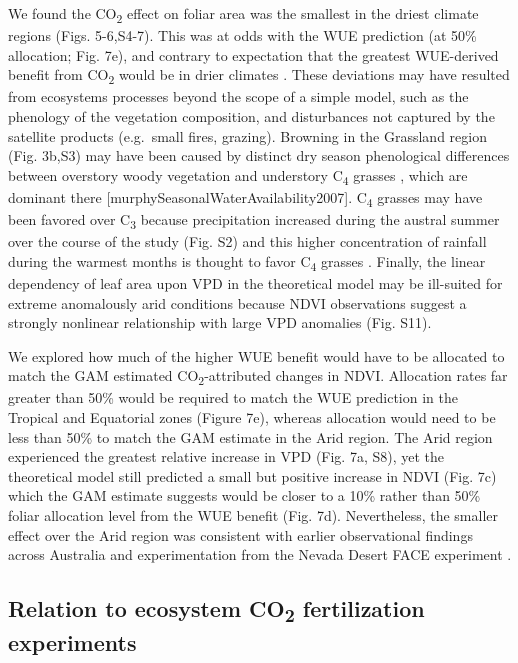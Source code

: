 \documentclass[gc, manuscript]{copernicus}
\begin{document}
We found the CO\textsubscript{2} effect on foliar area was the smallest
in the driest climate regions (Figs. 5-6,S4-7). This was at odds with
the WUE prediction (at 50\% allocation; Fig. 7e), and contrary to
expectation that the greatest WUE-derived benefit from
CO\textsubscript{2} would be in drier climates
\citep{donohue_etal17, mcmurtrieWhyPlantgrowthResponse2008}. These
deviations may have resulted from ecosystems processes beyond the scope
of a simple model, such as the phenology of the vegetation composition,
and disturbances not captured by the satellite products (e.g.~small
fires, grazing). Browning in the Grassland region (Fig. 3b,S3) may have
been caused by distinct dry season phenological differences between
overstory woody vegetation and understory C\textsubscript{4} grasses
\citep{mooreReviewsSynthesesAustralian2016}, which are dominant there
{[}murphySeasonalWaterAvailability2007{]}. C\textsubscript{4} grasses
may have been favored over C\textsubscript{3} because precipitation
increased during the austral summer over the course of the study (Fig.
S2) and this higher concentration of rainfall during the warmest months
is thought to favor C\textsubscript{4} grasses
\citep{hattersleyDistributionC3C41983a, knappResolvingDustBowl2020, murphySeasonalWaterAvailability2007}.
Finally, the linear dependency of leaf area upon VPD in the theoretical
model may be ill-suited for extreme anomalously arid conditions because
NDVI observations suggest a strongly nonlinear relationship with large
VPD anomalies (Fig. S11).

We explored how much of the higher WUE benefit would have to be
allocated to match the GAM estimated CO\textsubscript{2}-attributed
changes in NDVI. Allocation rates far greater than 50\% would be
required to match the WUE prediction in the Tropical and Equatorial
zones (Figure 7e), whereas allocation would need to be less than 50\% to
match the GAM estimate in the Arid region. The Arid region experienced
the greatest relative increase in VPD (Fig. 7a, S8), yet the theoretical
model still predicted a small but positive increase in NDVI (Fig. 7c)
which the GAM estimate suggests would be closer to a 10\% rather than
50\% foliar allocation level from the WUE benefit (Fig. 7d).
Nevertheless, the smaller effect over the Arid region was consistent
with earlier observational findings across Australia
\citep{ukkolaReducedStreamflowWaterstressed2016b} and experimentation
from the Nevada Desert FACE experiment
\citep{smithLongtermResponseMojave2014}.

\subsection{\texorpdfstring{Relation to ecosystem CO\textsubscript{2}
fertilization
experiments}{Relation to ecosystem CO2 fertilization experiments}}
\end{document}
